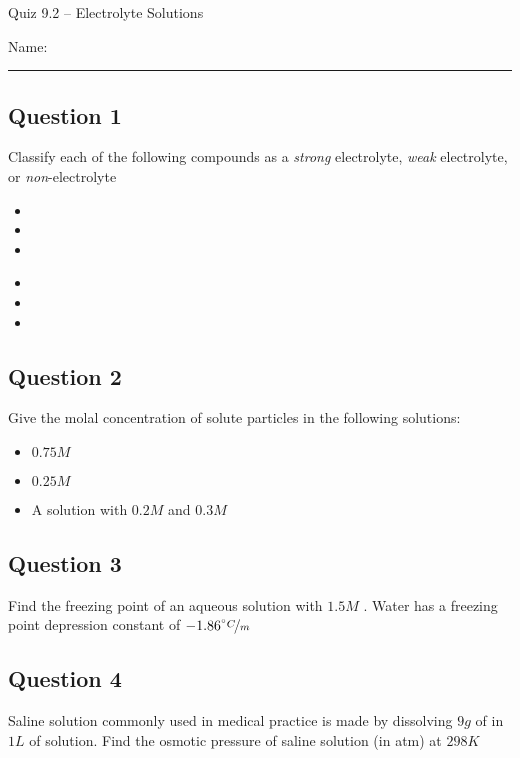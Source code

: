 \documentclass[11pt, letterpaper]{memoir}
\begin{document}
	\begin{center}
		{\large Quiz 9.2 --	Electrolyte Solutions}
	\end{center}
	{\large Name: \rule[-1mm]{4in}{.1pt} 

\subsection*{Question 1}
Classify each of the following compounds as a \emph{strong} electrolyte, \emph{weak} electrolyte, or \emph{non}-electrolyte

\noindent
\begin{minipage}{0.5\linewidth}
\begin{itemize}
	\item {}
	\item {}
	\item {}
\end{itemize}
\end{minipage}
\begin{minipage}{0.5\linewidth}
	\begin{itemize}
		\item {}
		\item {}
		\item {}
	\end{itemize}
\end{minipage}

\subsection*{Question 2}
Give the molal concentration of solute particles in the following solutions:
\begin{itemize}
	\item $0.75M$ 
	\item $0.25M$ 
	\item A solution with $0.2M$  and $0.3M$ 
\end{itemize}

\subsection*{Question 3}
Find the freezing point of an aqueous solution with $1.5M$ . Water has a freezing point depression constant of $-1.86\nicefrac{^\circ C}{m}$

\vspace{7em}
\subsection*{Question 4}
Saline solution commonly used in medical practice is made by dissolving $9g$ of  in $1L$ of solution. Find the osmotic pressure of saline solution (in atm) at $298K$

}
\end{document}
